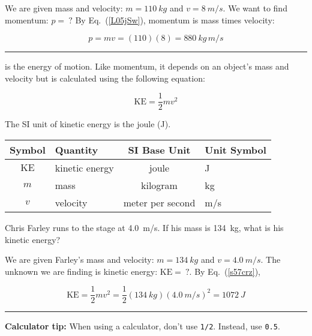 \documentclass{article}
\begin{document}
 We are given mass and velocity: $m = \SI{110}{kg}$ and $v = \SI{8}{m/s}$. We want to find momentum: $p =\ ?$ By Eq.~(\ref{L05jSw}), momentum is mass times velocity:

\begin{equation*}
    p = m v = (110)(8) = \SI{880}{kg\,m/s} 
\end{equation*}

\hrule

\vspace{1em}

 is the energy of motion. Like momentum, it depends on an object's mass and velocity but is calculated using the following equation:

\begin{equation} \label{s57crz}
    \mathrm{KE} = \frac{1}{2} m v^2 
\end{equation}

The SI unit of kinetic energy is the joule (J).

\begin{center}
    \begin{tabular}{cl|cl}
    \hline
    \textbf{Symbol} & \textbf{Quantity} & \textbf{SI Base Unit} & \textbf{Unit Symbol}  \\
    \hline\hline
    \rule{0pt}{2.5ex}
        $\mathrm{KE}$ & kinetic energy & joule & J\\
        $m$ & mass & kilogram & kg\\
        $v$ & velocity & meter per second & m/s\\
    \hline
    \end{tabular}
\end{center}

\begin{example} \label{5qVtmV}
Chris Farley runs to the stage at \SI{4.0}{m/s}. If his mass is \SI{134}{kg}, what is his kinetic energy?
\end{example}

 We are given Farley's mass and velocity: $m = \SI{134}{kg}$ and $v =  \SI{4.0}{m/s}$. The unknown we are finding is kinetic energy: $\mathrm{KE} =\ ?$. By Eq.~(\ref{s57crz}),

\begin{equation*}
    \mathrm{KE} = \frac{1}{2} m v^2 = \frac{1}{2} \left(\SI{134}{kg}\right) \left(\SI{4.0}{m/s}\right)^2 = \SI{1072}{J}
\end{equation*}

\hrule

\begin{mdframed}[backgroundcolor=black!10]
\textbf{Calculator tip:} When using a calculator, don't use \texttt{1/2}. Instead, use \texttt{0.5}. 
\end{mdframed}
\end{document}
